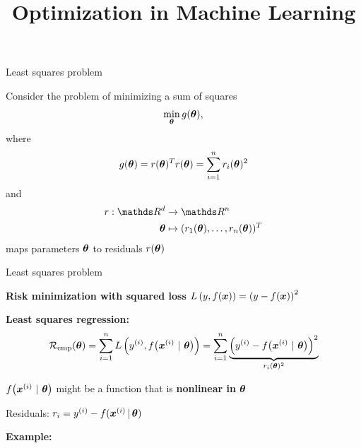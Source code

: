 \documentclass[11pt,compress,t,notes=noshow, xcolor=table]{beamer}
\title{Optimization in Machine Learning}
\begin{document}

\begin{framei}{Least squares problem}
\item Consider the problem of minimizing a sum of squares
$$
\min_{\bm{\theta}} g(\bm{\theta}),
$$
where
$$
g(\bm{\theta}) = r(\bm{\theta})^T r(\bm{\theta}) = \sum_{i = 1}^n r_i(\bm{\theta})^2
$$
and
$$
\begin{aligned}
r: \R^d &\to \R^n \\
\thetav &\mapsto (r_1(\thetav), \ldots, r_n(\thetav))^T
\end{aligned}
$$
maps parameters $\bm{\theta}$ to residuals $r(\bm{\theta})$
\end{framei}


\begin{framei}{Least squares problem}
\item \textbf{Risk minimization with squared loss} $L\left(y, f(\bm{x})\right) = \left(y - f(\bm{x})\right)^2$
\item \textbf{Least squares regression:}
$$
\mathcal{R}_{\text{emp}}(\bm{\theta}) = \sum\limits_{i=1}^n L\left(y^{(i)}, f\big(\bm{x}^{(i)} ~|~ \bm{\theta}\big)\right) = \sum\limits_{i=1}^n \underbrace{\left(y^{(i)} - f\big(\bm{x}^{(i)} ~|~ \bm{\theta}\big) \right)^2}_{r_i(\bm{\theta})^2}
$$
\item $f\big(\bm{x}^{(i)} ~|~ \bm{\theta}\big)$ might be a function that is \textbf{nonlinear in $\bm{\theta}$}
\item Residuals: $r_i = y^{(i)} - f(\bm{x}^{(i)} \,|\, \bm{\theta})$
\vfill
\item \textbf{Example:}
\end{framei}
\end{document}
